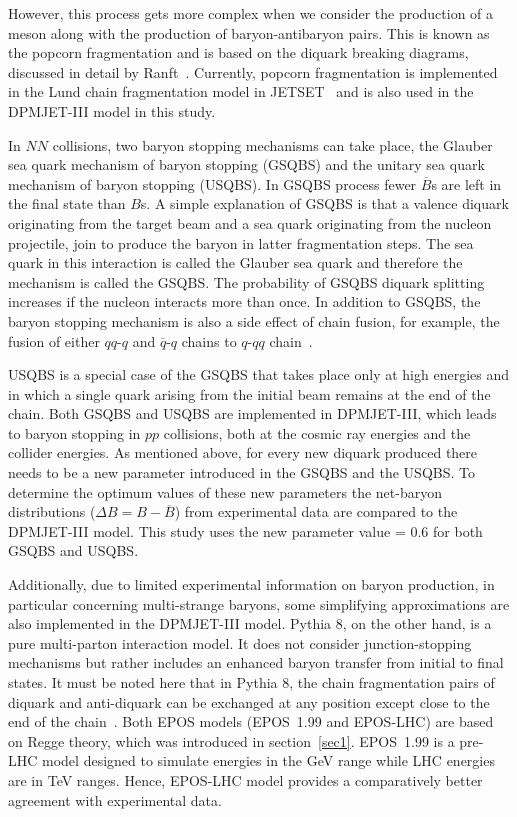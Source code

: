 \documentclass{article}
\begin{document}
 
However, this process gets more complex when we consider the production of a meson along with the production of baryon-antibaryon pairs. This is known as the popcorn fragmentation and is based on the diquark breaking diagrams,  discussed in detail by Ranft~\cite{22}.  Currently, popcorn fragmentation is implemented in the Lund chain fragmentation model in JETSET~\cite{31} and is also used in the DPMJET-III model in this study.
 


In $NN$ collisions, two baryon stopping mechanisms can take place, the Glauber sea quark mechanism of baryon stopping (GSQBS) and the unitary sea quark mechanism of baryon stopping (USQBS). In GSQBS process fewer $\overline{B}$s are left in the final state than $B$s. A simple explanation of GSQBS is that a valence diquark originating from the target beam and a sea quark originating from the nucleon projectile, join to produce the baryon in latter fragmentation steps. The sea quark in this interaction is called the Glauber sea quark and therefore the mechanism is called the GSQBS. The probability of GSQBS diquark splitting increases if the nucleon interacts more than once. In addition to GSQBS, the baryon stopping mechanism is also a side effect of chain fusion, for example, the fusion of either $qq$-$q$ and $\overline{q}$-$q$ chains to $q$-$qq$ chain~\cite{46}.


USQBS is a special case of the GSQBS that takes place only at high energies and in which a single quark arising from the initial beam remains at the end of the chain. Both GSQBS and USQBS are implemented in  DPMJET-III, which leads to baryon stopping in $pp$ collisions, both at the cosmic ray energies and the collider energies. As mentioned above, for every new diquark produced there needs to be a new parameter introduced in the GSQBS and the USQBS. To determine the optimum values of these new parameters the net-baryon distributions ($\Delta B = B-\overline{B}$) from experimental data are compared to the DPMJET-III model. This study uses the new parameter value = 0.6 for both GSQBS and USQBS. 

Additionally, due to limited experimental information on baryon production, in particular concerning multi-strange baryons, some simplifying approximations are also implemented in the DPMJET-III model. Pythia 8, on the other hand, is a pure multi-parton interaction model. It does not consider junction-stopping mechanisms but rather includes an enhanced baryon transfer from initial to final states. It must be noted here that in Pythia 8, the chain fragmentation pairs of diquark and anti-diquark can be exchanged at any position except close to the end of the chain~\cite{46}. Both EPOS models (EPOS~1.99 and EPOS-LHC) are based on Regge theory, which was introduced in section~\ref{sec1}. EPOS~1.99 is a pre-LHC model designed to simulate energies in the GeV range while LHC energies are in TeV ranges. Hence, EPOS-LHC model provides a comparatively better agreement with experimental data. 
\end{document}
